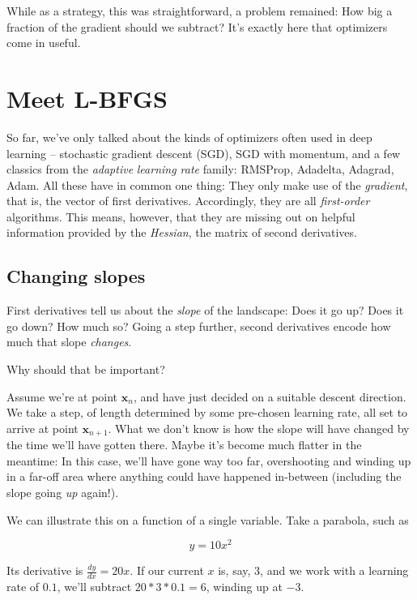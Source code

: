 \documentclass[
  letterpaper,
]{krantz}
\begin{document}
While as a strategy, this was straightforward, a problem remained: How
big a fraction of the gradient should we subtract? It's exactly here
that optimizers come in useful.

\hypertarget{meet-l-bfgs}{%
\section{\texorpdfstring{Meet
L-BFGS}{Meet L-BFGS}}\label{meet-l-bfgs}}

So far, we've only talked about the kinds of optimizers often used in
deep learning -- stochastic gradient descent (SGD), SGD with momentum,
and a few classics from the \emph{adaptive} \emph{learning rate} family:
RMSProp, Adadelta, Adagrad, Adam. All these have in common one thing:
They only make use of the \emph{gradient}, that is, the vector of first
derivatives. Accordingly, they are all \emph{first-order} algorithms.
This means, however, that they are missing out on helpful information
provided by the \emph{Hessian}, the matrix of second derivatives.

\hypertarget{changing-slopes}{%
\subsection{Changing slopes}\label{changing-slopes}}

First derivatives tell us about the \emph{slope} of the landscape: Does
it go up? Does it go down? How much so? Going a step further, second
derivatives encode how much that slope \emph{changes}.

Why should that be important?

Assume we're at point \(\mathbf{x}_n\), and have just decided on a
suitable descent direction. We take a step, of length determined by some
pre-chosen learning rate, all set to arrive at point
\(\mathbf{x}_{n+1}\). What we don't know is how the slope will have
changed by the time we'll have gotten there. Maybe it's become much
flatter in the meantime: In this case, we'll have gone way too far,
overshooting and winding up in a far-off area where anything could have
happened in-between (including the slope going \emph{up} again!).

We can illustrate this on a function of a single variable. Take a
parabola, such as

\[
y = 10x^2
\]

Its derivative is \(\frac{dy}{dx} = 20x\). If our current \(x\) is, say,
\(3\), and we work with a learning rate of \(0.1\), we'll subtract
\(20 * 3 * 0.1= 6\), winding up at \(-3\).
\end{document}
